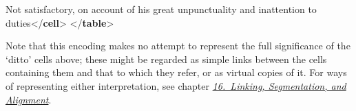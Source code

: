 \begin{shaded}
\hspace*{1em}Not satisfactory, on account of his great unpunctuality and\mbox{}\newline 
\hspace*{1em}\hspace*{1em}\hspace*{1em}\hspace*{1em} inattention to duties{</\textbf{cell}>}\mbox{}\newline 
{}\mbox{}\newline 
{</\textbf{table}>}\end{shaded}\egroup\par \noindent  \par
Note that this encoding makes no attempt to represent the full significance of the ‘ditto’ cells above; these might be regarded as simple links between the cells containing them and that to which they refer, or as virtual copies of it. For ways of representing either interpretation, see chapter \textit{\hyperref[SA]{16.\ Linking, Segmentation, and Alignment}}.\par
